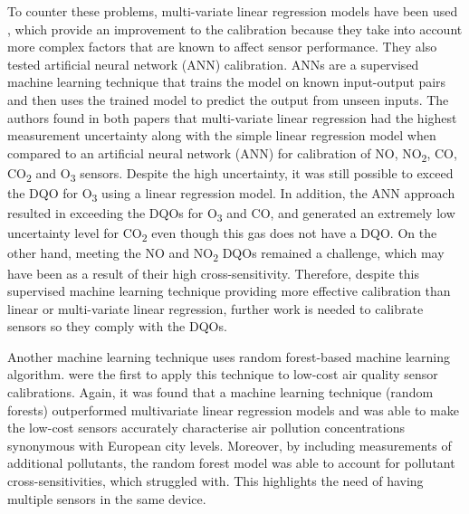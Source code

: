 \documentclass[11pt]{report}
\begin{document}
To counter these problems, multi-variate linear regression models have been used \citep{Spinelle2015fieldcalibrationa,Spinelle2017fieldcalibrationb}, which provide an improvement to the calibration because they take into account more complex factors that are known to affect sensor performance. They also tested artificial neural network (ANN) calibration. ANNs are a supervised machine learning technique that trains the model on known input-output pairs and then uses the trained model to predict the output from unseen inputs. The authors found in both papers that multi-variate linear regression had the highest measurement uncertainty along with the simple linear regression model when compared to an artificial neural network (ANN) for calibration of NO, NO\textsubscript{2}, CO, CO\textsubscript{2} and O\textsubscript{3} sensors. Despite the high uncertainty, it was still possible to exceed the DQO for O\textsubscript{3} using a linear regression model. In addition, the ANN approach resulted in exceeding the DQOs for O\textsubscript{3} and CO, and generated an extremely low uncertainty level for CO\textsubscript{2} even though this gas does not have a DQO. On the other hand, meeting the NO and NO\textsubscript{2} DQOs remained a challenge, which may have been as a result of their high cross-sensitivity. Therefore, despite this supervised machine learning technique providing more effective calibration than linear or multi-variate linear regression, further work is needed to calibrate sensors so they comply with the DQOs.



Another machine learning technique uses random forest-based machine learning algorithm. \cite{zimmerman2018machinelearning} were the first to apply this technique to low-cost air quality sensor calibrations. Again, it was found that a machine learning technique (random forests) outperformed multivariate linear regression models and was able to make the low-cost sensors accurately characterise air pollution concentrations synonymous with European city levels. Moreover, by including measurements of additional pollutants, the random forest model was able to account for pollutant cross-sensitivities, which \cite{Spinelle2015fieldcalibrationa,Spinelle2017fieldcalibrationb} struggled with. This highlights the need of having multiple sensors in the same device.
\end{document}
